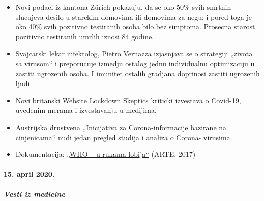 \begin{itemize}
{  puta vise ljudi} bilo kontaminirano virusom, nego sto se prvobitno
  pretpostavljalo, jer su pokazivali samo blage ili nikakve simptome.
  Stopa imunizacije iznosi oko 22\%.
\item
  Novi podaci iz kantona Zürich pokazuju, da se oko 50\% svih smrtnih
  slucajeva desilo u starckim domovima ili domovima za negu; i pored
  toga je oko 40\% svih pozitivno testiranih osoba bilo bez simptoma.
  Prosecna starost pozitivno testiranih umrlih iznosi 84 godine.
\item
  Svajcarski lekar infektolog, Pietro Vernazza izjasnjava se o
  strategiji
  „\href{https://infekt.ch/2020/04/exitstrategie-lockdown/}{zivota sa
  virusom}`` i preporucuje izmedju ostalog jednu individualnu
  optimizaciju u zastiti ugrozenih osoba. I imunitet ostalih gradjana
  doprinosi zastiti ugrozenih ljudi.
\item
  Novi britanski Website \href{https://lockdownsceptics.org/}{Lockdown
  Skeptics} kriticki izvestava o Covid-19, uvedenim merama i
  izvestavanju u medijima.
\item
  Austrijska drustvena
  „\href{https://www.initiative-corona.info/}{Inicijativa za
  Corona-informacije bazirane na cinjenicama}`` nudi jedan pregled
  studija i analiza o Corona- virusima.
\item
  Dokumentacija: \href{https://www.youtube.com/watch?v=dYlia_fQOLk}{„WHO
  -- u rukama lobija``} (ARTE, 2017)
\end{itemize}

\hypertarget{15-april-2020}{%
\paragraph{15. april 2020.}\label{15-april-2020}}

\hypertarget{vesti-iz-medicine}{%
\subparagraph{\texorpdfstring{\textbf{Vesti iz
medicine}}{Vesti iz medicine}}\label{vesti-iz-medicine}}

